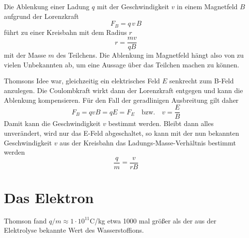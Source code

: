 Die Ablenkung einer Ladung $q$ mit der Geschwindigkeit $v$ in einem Magnetfeld $B$ aufgrund der Lorenzkraft
\begin{equation}
    F_B = q \, v \, B
\end{equation}
führt zu einer Kreisbahn mit dem Radius $r$
\begin{equation}
    r = \frac{m v}{q B}
\end{equation}
mit der Masse $m$ des Teilchens. Die Ablenkung im Magnetfeld hängt also von zu vielen Unbekannten ab, um eine Aussage über das Teilchen machen zu können.

Thomsons Idee war, gleichzeitig ein elektrisches Feld $E$ senkrecht zum B-Feld anzulegen. Die Coulombkraft wirkt dann der Lorenzkraft entgegen und kann die Ablenkung kompensieren. Für den Fall der geradlinigen Ausbreitung gilt daher
\begin{equation}
    F_B = q v B = q E = F_E  \quad \text{bzw.} \quad v = \frac{E}{B} 
\end{equation}
Damit kann die Geschwindigkeit $v$ bestimmt werden. Bleibt dann alles unverändert, wird nur das E-Feld abgeschaltet, so kann mit der nun bekannten Geschwindigkeit $v$ aus der Kreisbahn das Ladungs-Masse-Verhältnis bestimmt werden
\begin{equation}
    \frac{q}{m} = \frac{v}{r B}
\end{equation}

\section{Das Elektron}

Thomson fand $q/m \approx 1 \cdot 10^{11}$C/kg etwa 1000 mal größer als der aus der Elektrolyse bekannte Wert des Wasserstoffions.



\printbibliography[segment=\therefsegment,heading=subbibliography]
